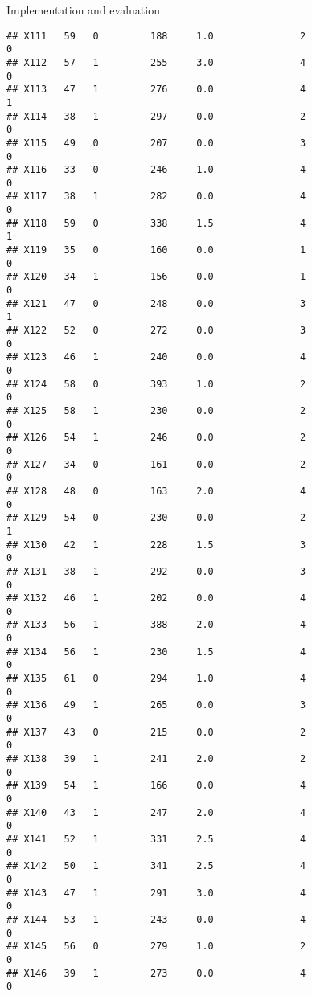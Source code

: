 \documentclass[
  ignorenonframetext,
]{beamer}
\begin{document}
\begin{frame}[fragile]{Implementation and evaluation}
\begin{verbatim}
## X111   59   0         188     1.0               2                   0
## X112   57   1         255     3.0               4                   0
## X113   47   1         276     0.0               4                   1
## X114   38   1         297     0.0               2                   0
## X115   49   0         207     0.0               3                   0
## X116   33   0         246     1.0               4                   0
## X117   38   1         282     0.0               4                   0
## X118   59   0         338     1.5               4                   1
## X119   35   0         160     0.0               1                   0
## X120   34   1         156     0.0               1                   0
## X121   47   0         248     0.0               3                   1
## X122   52   0         272     0.0               3                   0
## X123   46   1         240     0.0               4                   0
## X124   58   0         393     1.0               2                   0
## X125   58   1         230     0.0               2                   0
## X126   54   1         246     0.0               2                   0
## X127   34   0         161     0.0               2                   0
## X128   48   0         163     2.0               4                   0
## X129   54   0         230     0.0               2                   1
## X130   42   1         228     1.5               3                   0
## X131   38   1         292     0.0               3                   0
## X132   46   1         202     0.0               4                   0
## X133   56   1         388     2.0               4                   0
## X134   56   1         230     1.5               4                   0
## X135   61   0         294     1.0               4                   0
## X136   49   1         265     0.0               3                   0
## X137   43   0         215     0.0               2                   0
## X138   39   1         241     2.0               2                   0
## X139   54   1         166     0.0               4                   0
## X140   43   1         247     2.0               4                   0
## X141   52   1         331     2.5               4                   0
## X142   50   1         341     2.5               4                   0
## X143   47   1         291     3.0               4                   0
## X144   53   1         243     0.0               4                   0
## X145   56   0         279     1.0               2                   0
## X146   39   1         273     0.0               4                   0

\end{verbatim}
\end{frame}
\end{document}

